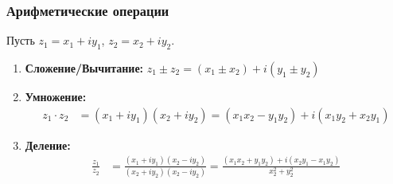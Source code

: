 \documentclass[12pt, a4paper]{article}
\begin{document}
\subsubsection{Арифметические операции}
Пусть $z_1 = x_1 + iy_1$, $z_2 = x_2 + iy_2$.
\begin{enumerate}
    \item \textbf{Сложение/Вычитание:}
    $z_1 \pm z_2 = (x_1 \pm x_2) + i(y_1 \pm y_2)$
    \item \textbf{Умножение:}
    \begin{align*}
    z_1 \cdot z_2 &= (x_1 + iy_1)(x_2 + iy_2) = (x_1x_2 - y_1y_2) + i(x_1y_2 + x_2y_1)
    \end{align*}
    \item \textbf{Деление:}
    \begin{align*}
    \frac{z_1}{z_2} &= \frac{(x_1 + iy_1)(x_2 - iy_2)}{(x_2 + iy_2)(x_2 - iy_2)} = \frac{(x_1x_2 + y_1y_2) + i(x_2y_1 - x_1y_2)}{x_2^2 + y_2^2}\\
    \end{align*}
\end{enumerate}
\end{document}
